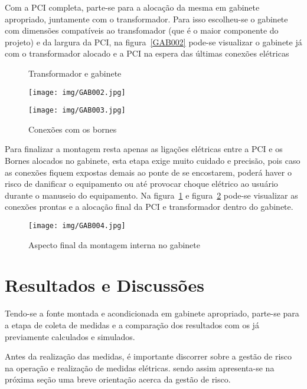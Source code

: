 \documentclass[
	article,			%
	11pt,				%
	oneside,			%
	a4paper,			%
	english,			%
	brazil,				%
	sumario=tradicional
	]{abntex2}
\begin{document}
Com a PCI completa, parte-se para a alocação da mesma em gabinete apropriado, juntamente com o transformador. Para isso escolheu-se o gabinete com dimensões compatíveis ao transfomador (que é o maior componente do projeto) e da largura da PCI, na figura~\ref{GAB002} pode-se visualizar o gabinete já com o transformador alocado e a PCI na espera das últimas conexões elétricas
\begin{figure}[htb!]
   \centering
   \begin{minipage}{0.4\textwidth}
   		\centering
   		\caption{Transformador e gabinete} \label{GAB002}
   		\texttt{[image: img/GAB002.jpg]}
   \end{minipage}
   \hspace{1.5cm}
   \begin{minipage}{0.4\textwidth}
   		\centering
   		\caption{Conexões com os bornes} \label{GAB003}
   		\texttt{[image: img/GAB003.jpg]} 
   \end{minipage}
\end{figure}

Para finalizar a montagem resta apenas as ligações elétricas entre a PCI e os Bornes alocados no gabinete, esta etapa exige muito cuidado e precisão, pois caso as conexões fiquem expostas demais ao ponte de se encostarem, poderá haver o risco de danificar o equipamento ou até provocar choque elétrico ao usuário durante o manuseio do equipamento. Na figura~\ref{GAB003} e figura~\ref{GAB004} pode-se visualizar as conexões prontas e a alocação final da PCI e transformador dentro do gabinete.

\begin{figure}
	\centering
	\caption{Aspecto final da montagem interna no gabinete}
	\texttt{[image: img/GAB004.jpg]}
	\label{GAB004}
\end{figure}

\section{Resultados e Discussões}

Tendo-se a fonte montada e acondicionada em gabinete apropriado, parte-se para a etapa de coleta de medidas e a comparação dos resultados com os já previamente calculados e simulados.

Antes da realização das medidas, é importante discorrer sobre a gestão de risco na operação e realização de medidas elétricas. sendo assim apresenta-se na próxima seção uma breve orientação acerca da gestão de risco.
\end{document}
